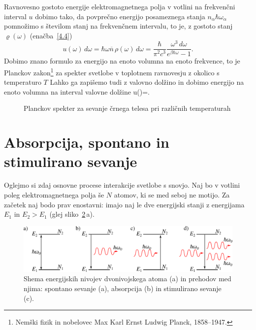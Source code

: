 Ravnovesno gostoto energije elektromagnetnega polja v votlini na
frekvenčni interval $u$ dobimo tako, da povprečno energijo posameznega
stanja $n_{\alpha}\hbar\omega_{\alpha}$ pomnožimo s številom stanj
na frekvenčnem intervalu, to je, z gostoto stanj $\varrho (\omega)$ 
(enačba~\ref{4.4})
\begin{equation}
u(\omega)\, d\omega=\hbar\omega\overline{n}\, \rho(\omega)\, 
d\omega=\frac{\hbar}{\pi^{2}c^{3}}\frac{\omega^{3}\, d\omega}{e^{\beta\hbar\omega}-1}.
\label{4.15}
\end{equation}
Dobimo znano formulo za energijo na enoto volumna na enoto frekvence, 
to je Planckov 
zakon\footnote{Nemški fizik in nobelovec Max Karl Ernst Ludwig Planck, 1858--1947.} 
za spekter svetlobe v toplotnem ravnovesju z okolico s temperaturo $T$
Lahko ga zapišemo tudi z valovno dolžino in dobimo energijo na enoto volumna
na interval valovne dolžine
\beq
u(\lambda)=.
\eeq

\begin{figure}[h]
\centering
\def\svgwidth{100truemm} 
%
\caption{Planckov spekter za sevanje črnega telesa pri različnih temperaturah}
\label{fig:Planck}
\end{figure}

\section{Absorpcija, spontano in stimulirano sevanje}

Oglejmo si zdaj osnovne procese interakcije svetlobe s snovjo. Naj
bo v votlini poleg elektromagnetnega polja še $N$ atomov, ki se med
seboj ne motijo. Za začetek naj bodo prav enostavni: 
imajo naj le dve energijski stanji z energijama $E_{1}$ in $E_{2}>E_1$ (glej sliko~\ref{sl4.1}\,a).\\
\begin{figure}[h]
\centering
\includegraphics[width=14truecm]{slike/05_Dvonivojski.png}
\caption{Shema energijskih nivojev dvonivojskega atoma (a) in prehodov med njima:
spontano sevanje (a), absorpcija (b) in stimulirano sevanje (c).}
\label{sl4.1}
\end{figure}


